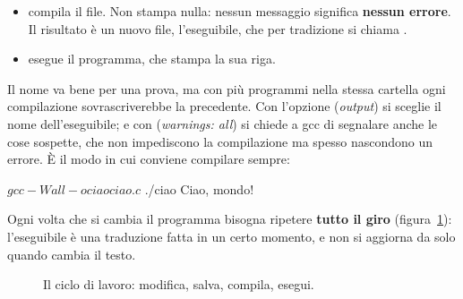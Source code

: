 \begin{itemize}
  \item {} compila il file. Non stampa nulla: nessun
        messaggio significa \textbf{nessun errore}. Il risultato è un nuovo
        file, l'eseguibile, che per tradizione si chiama .
  \item {} esegue il programma, che stampa la sua riga.
\end{itemize}

Il nome  va bene per una prova, ma con più programmi nella
stessa cartella ogni compilazione sovrascriverebbe la precedente. Con
l'opzione  (\textit{output}) si sceglie il nome dell'eseguibile; e
con  (\textit{warnings: all}) si chiede a gcc di segnalare
anche le cose sospette, che non impediscono la compilazione ma spesso
nascondono un errore. È il modo in cui conviene compilare sempre:

\begin{console}
$ gcc -Wall -o ciao ciao.c
$ ./ciao
Ciao, mondo!
\end{console}

Ogni volta che si cambia il programma bisogna ripetere \textbf{tutto il
giro} (figura~\ref{fig:ciclo}): l'eseguibile è una traduzione fatta in un
certo momento, e non si aggiorna da solo quando cambia il testo.

\begin{figure}[H]
  \centering
  \caption{Il ciclo di lavoro: modifica, salva, compila, esegui.}
  \label{fig:ciclo}
\end{figure}

